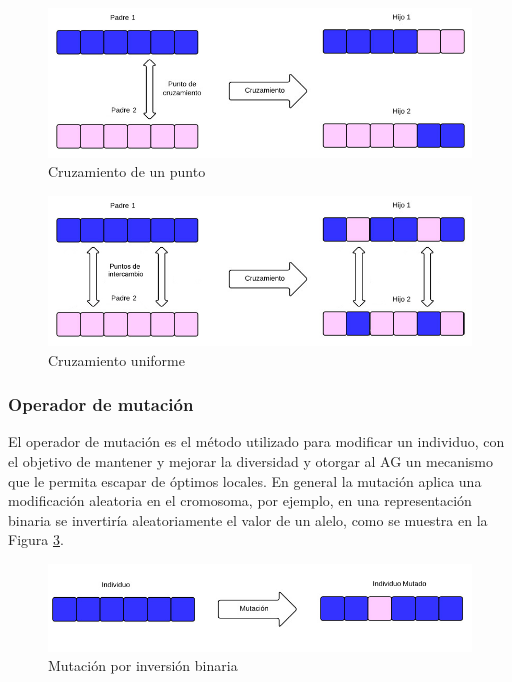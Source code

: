\begin{figure}[ht]
	\centering
	\includegraphics[width=\textwidth]{Figures/cruzamiento1}
	\caption{Cruzamiento de un punto}
	\label{fig:cruzamiento1}
\end{figure}

\begin{figure}[ht]
	\centering
	\includegraphics[width=\textwidth]{Figures/cruzamiento_uniforme}
	\caption{Cruzamiento uniforme}
	\label{fig:cruzamiento_uniforme}
\end{figure}

\subsubsection{Operador de mutación} 
El operador de mutación es el método utilizado para modificar un individuo, con el objetivo de mantener y mejorar la diversidad y otorgar al AG un mecanismo que le permita escapar de óptimos locales. En general la mutación aplica una modificación aleatoria en el cromosoma, por ejemplo, en una representación binaria se invertiría aleatoriamente el valor de un alelo, como se muestra en la Figura \ref{fig:mutacion1}.
\begin{figure}[ht!]
	\centering
	\includegraphics[width=1\linewidth]{Figures/mutacion1}
	\caption{Mutación por inversión binaria}
	\label{fig:mutacion1}
\end{figure}



